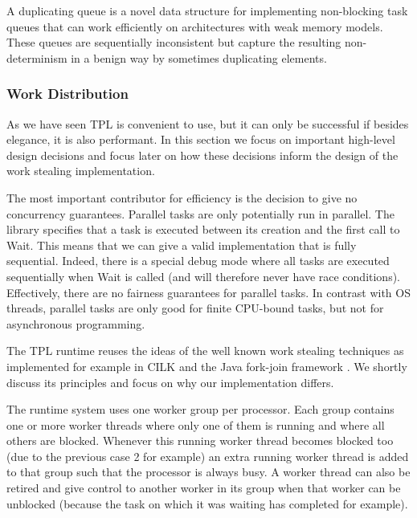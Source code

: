 A duplicating queue is a novel data structure for implementing
non-blocking task queues that can work efficiently on architectures
with weak memory models. These queues are sequentially inconsistent
but capture the resulting non-determinism in a benign way by sometimes
duplicating elements.

\subsubsection{Work Distribution}

As we have seen TPL is convenient to use, but it can only be
successful if besides elegance, it is also performant. In this section
we focus on important high-level design decisions and focus later on
how these decisions inform the design of the work stealing
implementation.


The most important contributor for efficiency is the decision to give
no concurrency guarantees. Parallel tasks are only potentially run in
parallel. The library specifies that a task is executed between its
creation and the first call to Wait. This means that we can give a
valid implementation that is fully sequential. Indeed, there is a
special debug mode where all tasks are executed sequentially when Wait
is called (and will therefore never have race
conditions). Effectively, there are no fairness guarantees for
parallel tasks. In contrast with OS threads, parallel tasks are only
good for finite CPU-bound tasks, but not for asynchronous programming.


The TPL runtime reuses the ideas of the well known work stealing
techniques as implemented for example in CILK \cite{Frigo1998,
  Danaher2005} and the Java fork-join framework \cite{Lea2000,
  Lea2000a, Lea2004, Lea2006}. We shortly discuss its principles and
focus on why our implementation differs.

The runtime system uses one worker group per processor. Each group
contains one or more worker threads where only one of them is running
and where all others are blocked. Whenever this running worker thread
becomes blocked too (due to the previous case 2 for example) an extra
running worker thread is added to that group such that the processor
is always busy. A worker thread can also be retired and give control
to another worker in its group when that worker can be unblocked
(because the task on which it was waiting has completed for example).

